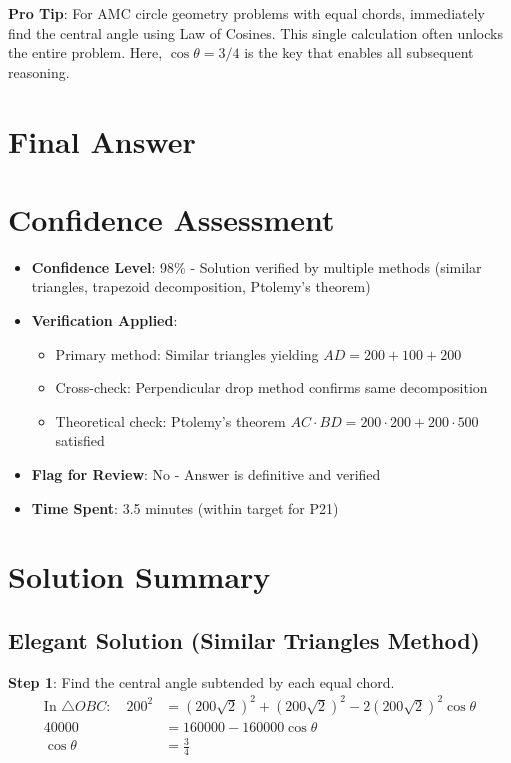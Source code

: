 \documentclass[12pt]{article}
\begin{document}
\begin{tipbox}
\textbf{Pro Tip}: For AMC circle geometry problems with equal chords, immediately find the central angle using Law of Cosines. This single calculation often unlocks the entire problem. Here, $\cos\theta = 3/4$ is the key that enables all subsequent reasoning.
\end{tipbox}

\section*{Final Answer}

\section*{Confidence Assessment}
\begin{itemize}[leftmargin=*]
    \item \textbf{Confidence Level}: 98\% - Solution verified by multiple methods (similar triangles, trapezoid decomposition, Ptolemy's theorem)
    \item \textbf{Verification Applied}: 
    \begin{itemize}
        \item Primary method: Similar triangles yielding $AD = 200 + 100 + 200$
        \item Cross-check: Perpendicular drop method confirms same decomposition
        \item Theoretical check: Ptolemy's theorem $AC \cdot BD = 200 \cdot 200 + 200 \cdot 500$ satisfied
    \end{itemize}
    \item \textbf{Flag for Review}: No - Answer is definitive and verified
    \item \textbf{Time Spent}: 3.5 minutes (within target for P21)
\end{itemize}

\section*{Solution Summary}

\subsection*{Elegant Solution (Similar Triangles Method)}

\textbf{Step 1}: Find the central angle subtended by each equal chord.
\begin{align*}
\text{In } \triangle OBC: \quad 200^2 &= (200\sqrt{2})^2 + (200\sqrt{2})^2 - 2(200\sqrt{2})^2\cos\theta\\
40000 &= 160000 - 160000\cos\theta\\
\cos\theta &= \frac{3}{4}
\end{align*}
\end{document}
